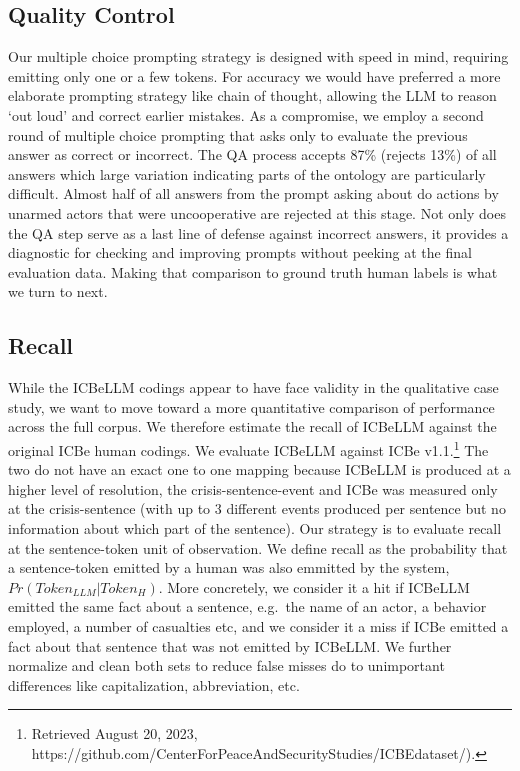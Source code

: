 \documentclass[
]{article}
\begin{document}
\subsection{Quality Control}\label{quality-control}

Our multiple choice prompting strategy is designed with speed in mind,
requiring emitting only one or a few tokens. For accuracy we would have
preferred a more elaborate prompting strategy like chain of thought,
allowing the LLM to reason `out loud' and correct earlier mistakes. As a
compromise, we employ a second round of multiple choice prompting that
asks only to evaluate the previous answer as correct or incorrect. The
QA process accepts 87\% (rejects 13\%) of all answers which large
variation indicating parts of the ontology are particularly difficult.
Almost half of all answers from the prompt asking about do actions by
unarmed actors that were uncooperative are rejected at this stage. Not
only does the QA step serve as a last line of defense against incorrect
answers, it provides a diagnostic for checking and improving prompts
without peeking at the final evaluation data. Making that comparison to
ground truth human labels is what we turn to next.

\subsection{Recall}\label{recall}

While the ICBeLLM codings appear to have face validity in the
qualitative case study, we want to move toward a more quantitative
comparison of performance across the full corpus. We therefore estimate
the recall of ICBeLLM against the original ICBe human codings. We
evaluate ICBeLLM against ICBe v1.1.\footnote{Retrieved August 20, 2023,
  https://github.com/CenterForPeaceAndSecurityStudies/ICBEdataset/).}
The two do not have an exact one to one mapping because ICBeLLM is
produced at a higher level of resolution, the crisis-sentence-event and
ICBe was measured only at the crisis-sentence (with up to 3 different
events produced per sentence but no information about which part of the
sentence). Our strategy is to evaluate recall at the sentence-token unit
of observation. We define recall as the probability that a
sentence-token emitted by a human was also emmitted by the system,
\(Pr(Token_{LLM} | Token_{H})\). More concretely, we consider it a hit
if ICBeLLM emitted the same fact about a sentence, e.g.~the name of an
actor, a behavior employed, a number of casualties etc, and we consider
it a miss if ICBe emitted a fact about that sentence that was not
emitted by ICBeLLM. We further normalize and clean both sets to reduce
false misses do to unimportant differences like capitalization,
abbreviation, etc.
\end{document}
